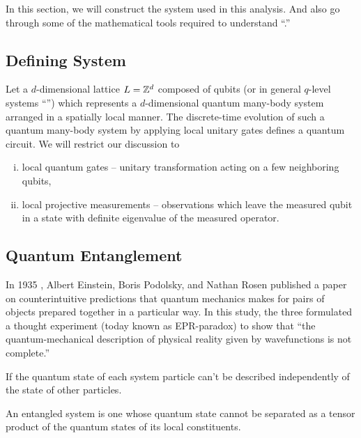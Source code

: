\documentclass[11pt, oneside, listof=totoc]{scrbook}
\begin{document}
In this section, we will construct the system used in this analysis. And also go through some of the mathematical tools required to understand ``.''

\subsection{Defining System}
Let a \(d\)-dimensional lattice \(L = \mathbb Z^{d}\) composed of qubits (or in general \(q\)-level systems ``'') which represents a \(d\)-dimensional quantum many-body system arranged in a spatially local manner. The discrete-time evolution of such a quantum many-body system by applying local unitary gates defines a quantum circuit. We will restrict our discussion to
\begin{enumerate}[(i), noitemsep]
    \item local quantum gates -- unitary transformation acting on a few neighboring qubits,
    \item local projective measurements -- observations which leave the measured qubit in a state with definite eigenvalue of the measured operator.
\end{enumerate}

\subsection{Quantum Entanglement}

In 1935 \cite{Einstein1935}, Albert Einstein, Boris Podolsky, and Nathan Rosen published a paper on counterintuitive predictions that quantum mechanics makes for pairs of objects prepared together in a particular way. In this study, the three formulated a thought experiment (today known as EPR-paradox) to show that ``the quantum-mechanical description of physical reality given by wavefunctions is not complete.''

\begin{definition}
    If the quantum state of each system particle can't be described independently of the state of other particles.

    An entangled system is one whose quantum state cannot be separated as a tensor product of the quantum states of its local constituents.
\end{definition}
\end{document}
